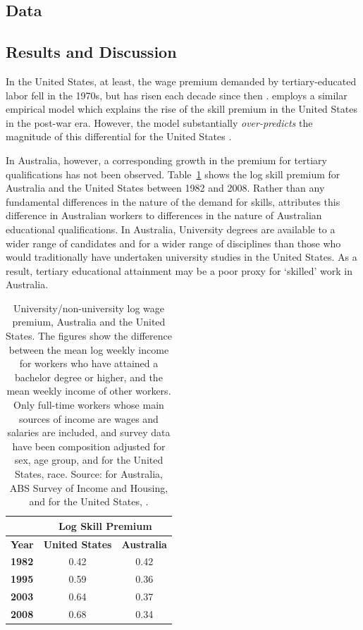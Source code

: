\documentclass[a4paper,11pt]{article}
\begin{document}
\subsection{Data}



\subsection{Results and Discussion}

In the United States, at least, the wage premium demanded by tertiary-educated labor fell in the 1970s, but has risen each decade since then \citep{Acemoglu2011}. \citet{Katz1992} employs a similar empirical model which explains the rise of the skill premium in the United States in the post-war era. However, the model substantially \emph{over-predicts} the magnitude of this differential for the United States \citep{Autor2008}. 

In Australia, however, a corresponding growth in the premium for tertiary qualifications has not been observed. Table~\ref{tbl:wagepremium} shows the log skill premium for Australia and the United States between 1982 and 2008. Rather than any fundamental differences in the nature of the demand for skills, \citet{Coelli2009} attributes this difference in Australian workers to differences in the nature of Australian educational qualifications. In Australia, University degrees are available to a wider range of candidates and for a wider range of disciplines than those who would traditionally have undertaken university studies in the United States. As a result, tertiary educational attainment may be a poor proxy for `skilled' work in Australia.
\begin{table}
  \centering
  \begin{tabular}{lcc}
  \hline
           & \multicolumn{2}{c}{\bf Log Skill Premium} \\
\hline
{\bf Year} &	{\bf United States} & {\bf Australia} \\
{\bf 1982} &	0.42 &	0.42 \\
{\bf 1995} &	0.59 &	0.36 \\
{\bf 2003} &	0.64 &	0.37 \\
{\bf 2008} &	0.68 &	0.34 \\ \hline
\end{tabular}
  \caption{University/non-university log wage premium, Australia and the United States. The figures show the difference between the mean log weekly income for workers who have attained a bachelor degree or higher, and the mean weekly income of other workers. Only full-time workers whose main sources of income are wages and salaries are included, and survey data have been composition adjusted for sex, age group, and for the United States, race. Source: for Australia, ABS Survey of Income and Housing, and for the United States, \citet{Acemoglu2011}.}
  \label{tbl:wagepremium}
\end{table}
\end{document}
